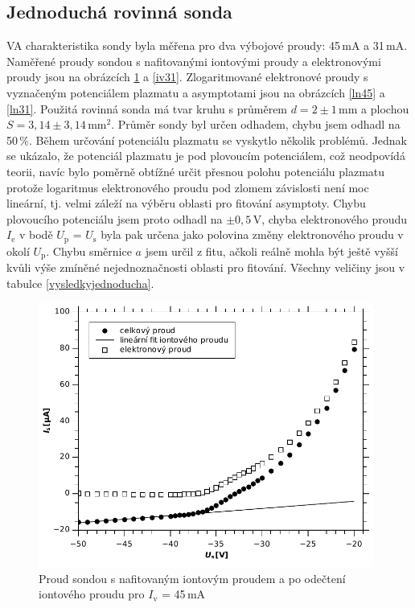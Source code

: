 \documentclass[12pt]{article}
\begin{document}
\subsection{Jednoduchá rovinná sonda}
VA charakteristika sondy byla měřena pro dva výbojové proudy: 45\,mA a 31\,mA. Naměřené proudy sondou s nafitovanými iontovými proudy a elektronovými proudy jsou na obrázcích \ref{iv45} a \ref{iv31}. Zlogaritmované elektronové proudy s vyznačeným potenciálem plazmatu a asymptotami jsou na obrázcích \ref{ln45} a \ref{ln31}. Použitá rovinná sonda má tvar kruhu s průměrem $d=2\pm1\,\mathrm{mm}$ a plochou $S=3,14\pm3,14\,\mathrm{mm^2}$. Průměr sondy byl určen odhadem, chybu jsem odhadl na 50\,\%. 
Během určování potenciálu plazmatu se vyskytlo několik problémů. Jednak se ukázalo, že potenciál plazmatu je pod plovoucím potenciálem, což neodpovídá teorii, navíc bylo poměrně obtížné určit přesnou polohu potenciálu plazmatu protože logaritmus elektronového proudu pod zlomem závislosti není moc lineární, tj. velmi záleží na výběru oblasti pro fitování asymptoty. Chybu plovoucího potenciálu jsem proto odhadl na $\pm0,5\,\mathrm{V}$, chyba elektronového proudu $I_\mathrm{e}$ v bodě $U_\mathrm{p}$ = $U_\mathrm{s}$ byla pak určena jako polovina změny elektronového proudu v okolí $U_\mathrm{p}$. Chybu směrnice $a$ jsem určil z fitu, ačkoli reálně mohla být ještě vyšší kvůli výše zmíněné nejednoznačnosti oblasti pro fitování. Všechny veličiny jsou v tabulce \ref{vysledkyjednoducha}. 

\begin{figure}[htbp]
\begin{center}
\includegraphics[width=11cm]{proudiv45.pdf}
\caption{Proud sondou s nafitovaným iontovým proudem a po odečtení iontového proudu pro $I_\mathrm{v}$ = 45\,mA}
\label{iv45}
\end{center}
\end{figure}
\end{document}
